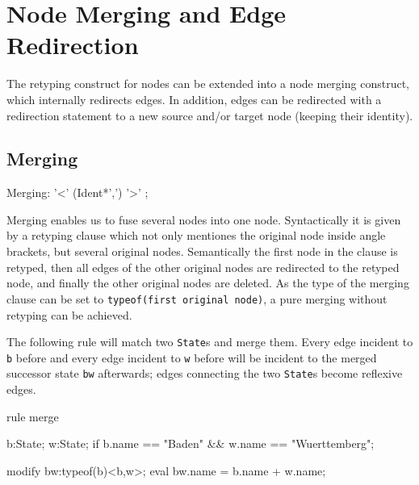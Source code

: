 


\section{Node Merging and Edge Redirection}

The retyping construct for nodes can be extended into a node merging construct,
which internally redirects edges.
In addition, edges can be redirected with a redirection statement to a new source and/or target node (keeping their identity).

\subsection{Merging} \label{sec:merge}
\begin{rail}
  Merging: '<' (Ident*',') '>' ;
\end{rail}

Merging enables us to fuse several nodes into one node.
Syntactically it is given by a retyping clause which not only mentiones the original node inside angle brackets, but several original nodes.
Semantically the first node in the clause is retyped, then all edges of the other original nodes are redirected to the retyped node, and finally the other original nodes are deleted.
As the type of the merging clause can be set to \texttt{typeof(first original node)}, a pure merging without retyping can be achieved.

\begin{example}
The following rule will match two \texttt{State}s and merge them.
Every edge incident to \texttt{b} before and every edge incident to \texttt{w} before will be incident to the merged successor state \texttt{bw} afterwards; edges connecting the two \texttt{State}s become reflexive edges.
\begin{grgen}
rule merge {
  b:State;
  w:State;
  if { b.name == "Baden" && w.name == "Wuerttemberg"; }

  modify {
    bw:typeof(b)<b,w>;
    eval { bw.name = b.name + w.name; }
  }
}
\end{grgen}
\end{example}

